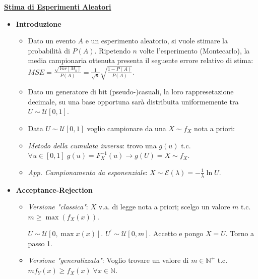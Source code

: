\documentclass[8pt]{extarticle}
\begin{document}
\begin{multicols*}{3}
    \hfill \break
    \textbf{\underline{Stima di Esperimenti Aleatori}}
    \begin{itemize}
        \item \textbf{Introduzione}
              \begin{itemize}
                  \item Dato un evento $A$ e un esperimento aleatorio, si vuole stimare la probabilità di $P(A)$. Ripetendo $n$ volte l'esperimento (Montecarlo), la media campionaria ottenuta presenta il seguente errore relativo di stima: $MSE=\frac{\sqrt{Var[M_{n}]}}{P(A)}=\frac{1}{\sqrt{n}}\sqrt{\frac{1-P(A)}{P(A)}}$.
                  \item Dato un generatore di bit (pseudo-)casuali, la loro rappresetazione decimale, su una base opportuna sarà distribuita uniformemente tra $U\sim\mathcal{U}[0,1]$.
                  \item Data $U\sim\mathcal{U}[0,1]$ voglio campionare da una $X\sim f_{X}$ nota a priori:
                  \item \textit{Metodo della cumulata inversa}: trovo una $g(u)$ t.c. $\forall u\in [0,1]\; g(u)=F_{X}^{-1}(u)\rightarrow g(U)=X\sim f_{X}$.
                  \item \textit{App. Campionamento da esponenziale}: $X\sim\mathcal{E}(\lambda)=-\frac{1}{\lambda}\ln{U}$.
              \end{itemize}
        \item \textbf{Acceptance-Rejection}
              \begin{itemize}
                  \item \textit{Versione "classica"}: $X$ v.a. di legge nota a priori; scelgo un valore $m$ t.c. $m\ge \max{}(f_{X}(x))$.
                        \begin{algorithmic}[1]
                            \State $U\sim\mathcal{U}[0,\max{x}(x)]$.
                            \State $U^{'}\sim\mathcal{U}[0,m]$.
                            \State Accetto e pongo $X=U$.
                            \Else
                            \State Torno a passo 1.
                            \EndIf
                        \end{algorithmic}
                  \item \textit{Versione "generalizzata"}: Voglio trovare un valore di $m\in\mathbb{N}^{+}$ t.c. $mf_{Y}(x)\ge f_{X}(x)\; \forall x\in\mathbb{N}$.
                        \begin{algorithmic}[1]

\end{algorithmic}
\end{itemize}
\end{itemize}
\end{multicols*}
\end{document}
